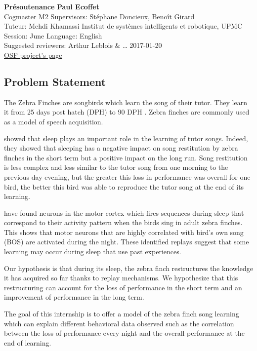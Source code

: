 \documentclass[a4paper]{article}
\begin{document}
\noindent
\large\textbf{Présoutenance} \hfill \textbf{Paul Ecoffet} \\
\normalsize Cogmaster M2 \hfill Supervisors: Stéphane Doncieux, Benoît Girard \\
Tuteur: Mehdi Khamassi \hfill Institut de systèmes intelligents et robotique, UPMC\\
Session: June \hfill Language: English\\
Suggested reviewers: Arthur Leblois \& … \hfill 2017-01-20\\
\href{https://osf.io/ja8k9/}{OSF project's page}
\begin{multicols}{2}
\section*{Problem Statement}

The Zebra Finches are songbirds which learn the song of their tutor. They learn
it from 25 days post hatch (DPH) to 90 DPH \parencite{liu_juvenile_2004}. Zebra
finches are commonly used as a model of speech acquisition.

\textcite{deregnaucourt_how_2005} showed that sleep plays an important role in
the learning of tutor songs. Indeed, they showed that sleeping has a negative
impact on song restitution by zebra finches in the short term but a positive
impact on the long run. Song restitution is less complex and less similar to the
tutor song from one morning to the previous day evening, but the greater this
loss in performance was overall for one bird, the better this bird was able to
reproduce the tutor song at the end of its learning.


\textcite{dave_song_2000} have found neurons in the motor cortex which fires
sequences during sleep that correspond to their activity pattern when the birds
sing in adult zebra finches. This shows that motor neurons that are highly
correlated with bird's own song (BOS) are activated during the night. These
identified replays suggest that some learning may occur during sleep that use
past experiences.

Our hypothesis is that during its sleep, the zebra finch restructures the
knowledge it has acquired so far thanks to replay mechanisms. We hypothesize
that this restructuring can account for the loss of performance in the short
term and an improvement of performance in the long term.

The goal of this internship is to offer a model of the zebra finch song
learning which can explain different behavioral data observed such as the
correlation between the loss of performance every night and the overall
performance at the end of learning.


\end{multicols}
\end{document}
